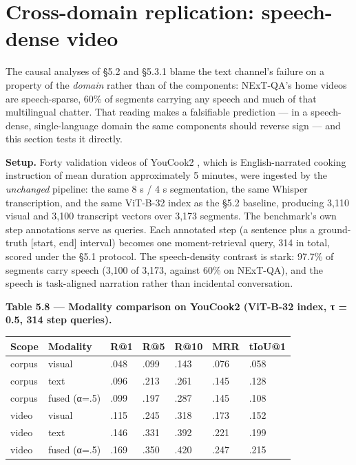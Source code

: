 \section{Cross-domain replication: speech-dense
video}

The causal analyses of §5.2 and §5.3.1 blame the text channel's failure
on a property of the \emph{domain} rather than of the components:
NExT-QA's home videos are speech-sparse, 60\% of segments carrying any
speech and much of that multilingual chatter. That reading makes a
falsifiable prediction --- in a speech-dense, single-language domain the
same components should reverse sign --- and this section tests it
directly.

\textbf{Setup.} Forty validation videos of YouCook2
\autocite{zhou2018youcook2}, which is English-narrated cooking
instruction of mean duration approximately 5 minutes, were ingested by
the \emph{unchanged} pipeline: the same 8 s / 4 s segmentation, the same
Whisper transcription, and the same ViT-B-32 index as the §5.2 baseline,
producing 3,110 visual and 3,100 transcript vectors over 3,173 segments.
The benchmark's own step annotations serve as queries. Each annotated
step (a sentence plus a ground-truth {[}start, end{]} interval) becomes
one moment-retrieval query, 314 in total, scored under the §5.1
protocol. The speech-density contrast is stark: 97.7\% of segments carry
speech (3,100 of 3,173, against 60\% on NExT-QA), and the speech is
task-aligned narration rather than incidental conversation.

\textbf{Table 5.8 --- Modality comparison on YouCook2 (ViT-B-32 index, τ
= 0.5, 314 step queries).}

\begin{longtable}[]{@{}lllllll@{}}
\toprule\noalign{}
Scope & Modality & R@1 & R@5 & R@10 & MRR & tIoU@1 \\
\midrule\noalign{}
\endhead
\bottomrule\noalign{}
\endlastfoot
corpus & visual & .048 & .099 & .143 & .076 & .058 \\
corpus & text & .096 & .213 & .261 & .145 & .128 \\
corpus & fused (α=.5) & .099 & .197 & .287 & .145 & .108 \\
video & visual & .115 & .245 & .318 & .173 & .152 \\
video & text & .146 & .331 & .392 & .221 & .199 \\
video & fused (α=.5) & .169 & .350 & .420 & .247 & .215 \\
\end{longtable}

